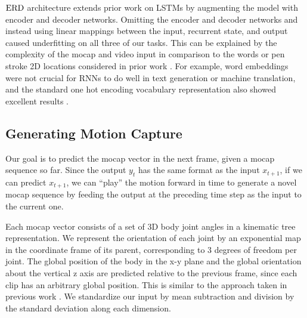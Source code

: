\documentclass[10pt,twocolumn,letterpaper]{article}
\begin{document}
 
 






















$\text{ERD}$ architecture extends prior work on LSTMs by augmenting the model with encoder and decoder networks.
Omitting the encoder and decoder networks and instead using linear mappings between the input, recurrent state, and output 
caused underfitting on all three of our tasks. 
This can be explained by the complexity of the mocap and video input in comparison to the words or pen stroke 2D  locations considered in prior work \cite{DBLP:journals/corr/Graves13}. For example, word embeddings were not crucial for RNNs to do well in text generation or machine translation, and the standard one hot encoding vocabulary representation also showed excellent results \cite{DBLP:conf/nips/SutskeverVL14}.


\subsection{Generating Motion Capture}


Our goal is to predict the mocap vector in the next frame, given a mocap sequence so far. Since the output $y_{t}$ has the same format as  the input $x_{t+1}$, if we can predict $x_{t+1}$, we can ``play'' the motion forward in time to generate a novel mocap sequence by feeding the output at the preceding time step as the input to the current one.







Each mocap  vector consists of a set of 3D body joint angles in a kinematic tree representation. 
We represent the orientation of each joint by an exponential map in the coordinate frame of its parent, corresponding to 3 degrees of freedom per joint. The global position of the body in the x-y plane and the global orientation about the vertical z axis are predicted relative to the previous frame, since each clip has an arbitrary global position. This is similar to the approach taken in previous work \cite{thr-mhmub-06}. We standardize our input by mean subtraction and division by the standard deviation along each dimension. 
\end{document}
